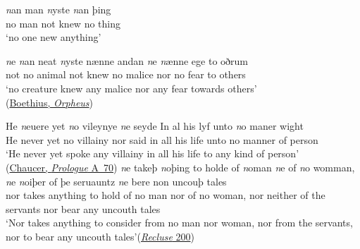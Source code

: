 \ea \label{ex:07-03}
\ea 
\gll \emph{n}an man \emph{n}yste \emph{n}an þing\\
no man {not knew}  no thing\\
\glt `no one new anything'

\ex \label{ex:07-04}
\gll \emph{n}e \emph{n}an neat \emph{n}yste nænne andan \emph{n}e \emph{n}ænne ege to oðrum\\
 not no animal {not knew} no malice nor no fear to others\\
\glt `no creature knew any malice nor any fear towards others'\\\hfill(\href{https://archive.org/details/analectaanglosax68thor/page/94/mode/2up?q=%22ne+nan+neat+nyste%22&view=theater}{Boethius, \textit{Orpheus}}) %
\z{}
\z

\ea \label{ex:07-05}
\ea {}
\gll He \emph{n}euere yet \emph{n}o vileynye \emph{n}e seyde In al his lyf unto \emph{n}o maner wight\\
 He never yet no villainy nor said in all his life unto no {manner of} person\\
\glt `He never yet spoke any villainy in all his life to any kind of person'\\\hfill(\href{https://archive.org/details/prologuefr89west00chau/page/2/mode/2up?view=theater&q=%22vileynye%22}{Chaucer, \textit{Prologue} A~70}) %
\ex {}
\gll \emph{n}e takeþ \emph{n}oþing to holde of \emph{n}oman \emph{n}e of \emph{n}o womman, \emph{n}e \emph{n}oiþer of þe seruauntz \emph{n}e bere non uncouþ tales\\
 nor takes anything to hold of {no man} nor of no woman, nor neither of the servants nor bear any uncouth tales\\
\glt `Nor takes anything to consider from no man nor woman, nor from the servants, nor to bear any uncouth tales'\hfill(\href{https://archive.org/details/englische-studien_1902_30/page/344/mode/2up?view=theater}{\textit{Recluse} 200}) %
\z
\z
{}

